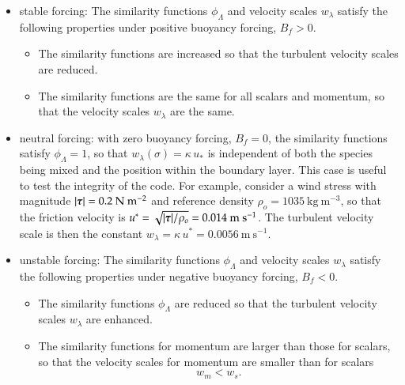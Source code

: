 \begin{itemize}

\item {\sc stable forcing}: The similarity functions
  $\phi_{\Lambda}$ and velocity scales $w_{\lambda}$ satisfy the
  following properties under positive buoyancy forcing, $B_{f}>0$.
 \begin{itemize}
 
 \item The similarity functions are increased so that the turbulent
   velocity scales are reduced.

 \item The similarity functions are the same for all scalars and
   momentum, so that the velocity scales $w_{\lambda}$ are the same.

\end{itemize}

\item {\sc neutral forcing}: with zero buoyancy forcing, $B_{f}=0$,
  the similarity functions satisfy $\phi_{\Lambda} = 1$, so that
  $w_{\lambda}(\sigma) = \kappa \, u_{*}$ is independent of both the
  species being mixed and the position within the boundary layer.
  This case is useful to test the integrity of the code.  For example,
  consider a wind stress with magnitude $|\mbox{\boldmath $\tau$}| =
  0.2~\mbox{N}~\mbox{m}^{-2}$ and reference density
  $\rho_{o}=1035~\mbox{kg}~\mbox{m}^{-3}$, so that the friction
  velocity is $u^{*}=\sqrt{|\mbox{\boldmath $\tau$}|/\rho_{o}} =
  0.014~\mbox{m}~\mbox{s}^{-1}$.  The turbulent velocity scale is then
  the constant $w_{\lambda} = \kappa \, u^{*} =
  0.0056~\mbox{m}~\mbox{s}^{-1}$.

\item {\sc unstable forcing}: The similarity functions
  $\phi_{\Lambda}$ and velocity scales $w_{\lambda}$ satisfy the
  following properties under negative buoyancy forcing, $B_{f}<0$.
 \begin{itemize}

 \item The similarity functions $\phi_{\Lambda}$ are reduced so that
   the turbulent velocity scales $w_{\lambda}$ are enhanced.

 \item The similarity functions for momentum are larger than those for
   scalars, so that the velocity scales for momentum are smaller than
   for scalars
\begin{equation}
 w_{m} < w_{s}.
\end{equation}


\end{itemize}
\end{itemize}
